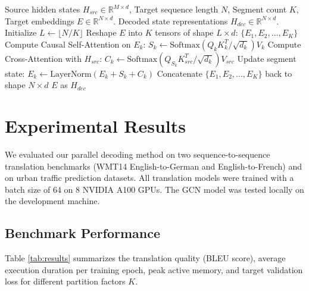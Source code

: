\documentclass[11pt,a4paper]{article}
\begin{document}
\begin{algorithm}
\caption{Parallel Segmented Decoder Forward Pass}
\begin{algorithmic}[1]
\REQUIRE Source hidden states $H_{src} \in \mathbb{R}^{M \times d}$, Target sequence length $N$, Segment count $K$, Target embeddings $E \in \mathbb{R}^{N \times d}$.
\ENSURE Decoded state representations $H_{dec} \in \mathbb{R}^{N \times d}$.
\STATE Initialize $L \leftarrow \lfloor N/K \rfloor$
\STATE Reshape $E$ into $K$ tensors of shape $L \times d$: $\{E_1, E_2, \dots, E_K\}$
        \STATE Compute Causal Self-Attention on $E_k$: $S_k \leftarrow \text{Softmax}(Q_k K_k^T / \sqrt{d_k}) V_k$
        \STATE Compute Cross-Attention with $H_{src}$: $C_k \leftarrow \text{Softmax}(Q_{S_k} K_{src}^T / \sqrt{d_k}) V_{src}$
        \STATE Update segment state: $E_k \leftarrow \text{LayerNorm}(E_k + S_k + C_k)$
    \ENDFOR
\ENDFOR
\STATE Concatenate $\{E_1, E_2, \dots, E_K\}$ back to shape $N \times d$
\RETURN $E$ as $H_{dec}$
\end{algorithmic}
\end{algorithm}

\section{Experimental Results}
We evaluated our parallel decoding method on two sequence-to-sequence translation benchmarks (WMT14 English-to-German and English-to-French) and on urban traffic prediction datasets. All translation models were trained with a batch size of 64 on 8 NVIDIA A100 GPUs. The GCN model was tested locally on the development machine.

\subsection{Benchmark Performance}
Table \ref{tab:results} summarizes the translation quality (BLEU score), average execution duration per training epoch, peak active memory, and target validation loss for different partition factors $K$.
\end{document}
